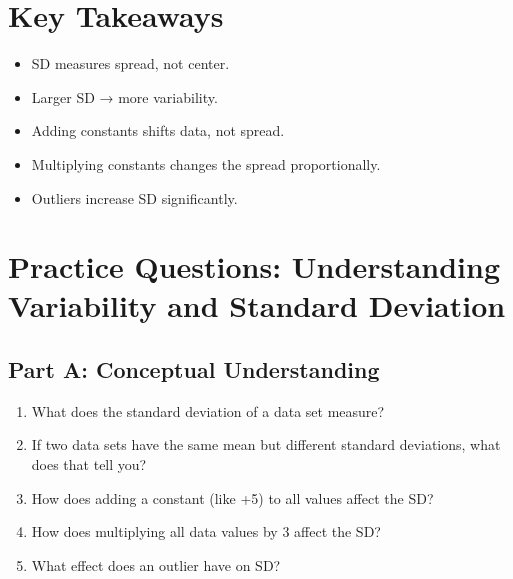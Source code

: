 \documentclass[14pt]{extarticle}
\begin{document}
\section*{Key Takeaways}
\begin{itemize}
  \item SD measures spread, not center.
  \item Larger SD → more variability.
  \item Adding constants shifts data, not spread.
  \item Multiplying constants changes the spread proportionally.
  \item Outliers increase SD significantly.
\end{itemize}

\newpage


\section*{Practice Questions: Understanding Variability and Standard Deviation}

\subsection*{Part A: Conceptual Understanding}
\begin{enumerate}
  \item What does the standard deviation of a data set measure?
  \item If two data sets have the same mean but different standard deviations, what does that tell you?
  \item How does adding a constant (like +5) to all values affect the SD?
  \item How does multiplying all data values by 3 affect the SD?
  \item What effect does an outlier have on SD?
\end{enumerate}
\end{document}
